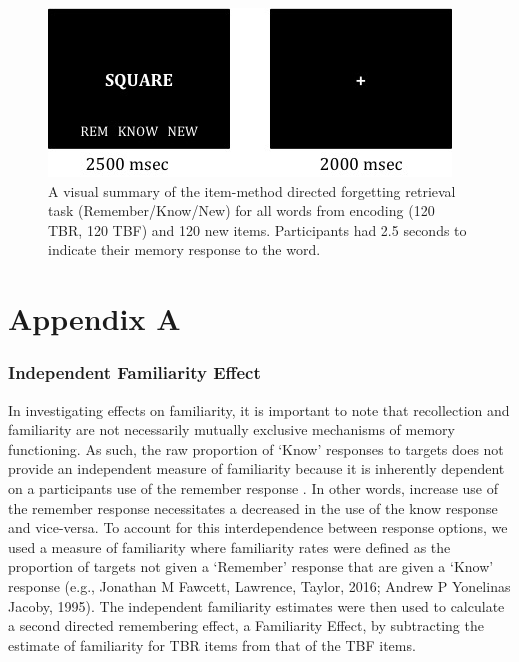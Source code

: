 \documentclass[man]{apa6}\usepackage[]{graphicx}\usepackage[]{color}
\begin{document}
\begin{figure}
    \centering
    \includegraphics{Fig2.jpg}
    \caption{A visual summary of the item-method directed forgetting retrieval task (Remember/Know/New) for all words from encoding (120 TBR, 120 TBF) and 120 new items. Participants had 2.5 seconds to indicate their memory response to the word.}
    \label{fig:Figure 2}
\end{figure}

\appendix

\section{Appendix A}

\subsubsection{Independent Familiarity Effect}

In investigating effects on familiarity, it is important to note that recollection and familiarity are not necessarily mutually exclusive mechanisms of memory functioning. As such, the raw proportion of ‘Know’ responses to targets does not provide an independent measure of familiarity because it is inherently dependent on a participants use of the remember response \parencite[see][]{jacoby.yonelinas.jennings1997,yonelinas.jacoby1995remknow}. In other words, increase use of the remember response necessitates a decreased in the use of the know response and vice-versa. To account for this interdependence between response options, we used a  measure of familiarity where familiarity rates were defined as the proportion of targets not given a ‘Remember’ response that are given a ‘Know’ response \parencite{yonelinas.jacoby1995remknow}(e.g., Jonathan M Fawcett, Lawrence,  Taylor, 2016; Andrew P Yonelinas  Jacoby, 1995). The independent familiarity estimates were then used to calculate a second directed remembering effect, a Familiarity Effect, by subtracting the estimate of familiarity for TBR items from that of the TBF items.
\end{document}
